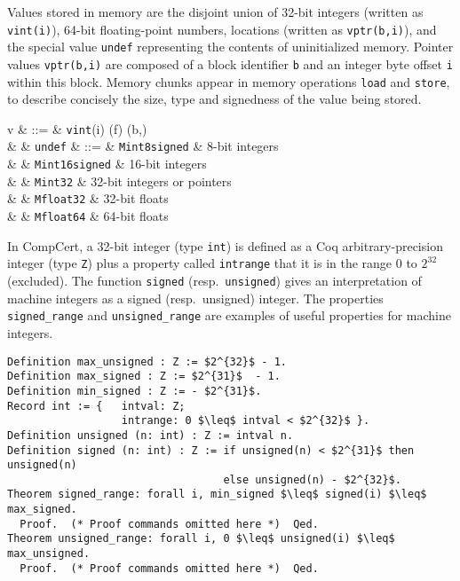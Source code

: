 Values stored in memory are the disjoint union of 32-bit
integers (written as  \lstinline!vint(i)!), 64-bit floating-point numbers,
locations (written as \lstinline!vptr(b,i)!), and the special value \lstinline!undef! representing the
contents of uninitialized memory. Pointer values \lstinline!vptr(b,i)! are
composed of a block identifier \lstinline!b! and an integer byte offset \lstinline!i! within this block. 
Memory chunks appear in memory operations \lstinline!load! and
\lstinline!store!, to describe concisely the size, type and signedness of the value being stored.
\begin{syntaxleft}
v & ::=  & {\tt vint}(i) (f) (b,\ofs) \\
& \mid & {\tt undef}
\chunk & ::= & {\tt Mint8signed}  & 8-bit integers \\
     & \mid& {\tt Mint16signed}  & 16-bit integers \\
     & \mid& {\tt Mint32} & 32-bit integers or pointers \\
     & \mid& {\tt Mfloat32} & 32-bit floats \\
     & \mid& {\tt Mfloat64} & 64-bit floats
\end{syntaxleft}

In CompCert, a 32-bit integer (type \lstinline!int!) is defined as 
a Coq arbitrary-precision integer (type \lstinline!Z!) plus a property called
\lstinline!intrange! that it
is in the range $0$ to $2^{32}$ (excluded). 
The function
\lstinline!signed! (resp.~\lstinline!unsigned!) gives an interpretation of machine 
integers as a signed (resp.~unsigned) integer. The properties 
\lstinline{signed_range} and \lstinline{unsigned_range} are examples
of useful properties for machine integers.


\begin{lstlisting}
Definition max_unsigned : Z := $2^{32}$ - 1.  
Definition max_signed : Z := $2^{31}$  - 1.
Definition min_signed : Z := - $2^{31}$.
Record int := {   intval: Z;
                  intrange: 0 $\leq$ intval < $2^{32}$ }.
Definition unsigned (n: int) : Z := intval n.
Definition signed (n: int) : Z := if unsigned(n) < $2^{31}$ then unsigned(n) 
                                  else unsigned(n) - $2^{32}$.
Theorem signed_range: forall i, min_signed $\leq$ signed(i) $\leq$ max_signed.
  Proof.  (* Proof commands omitted here *)  Qed.
Theorem unsigned_range: forall i, 0 $\leq$ unsigned(i) $\leq$ max_unsigned.
  Proof.  (* Proof commands omitted here *)  Qed.
\end{lstlisting}


